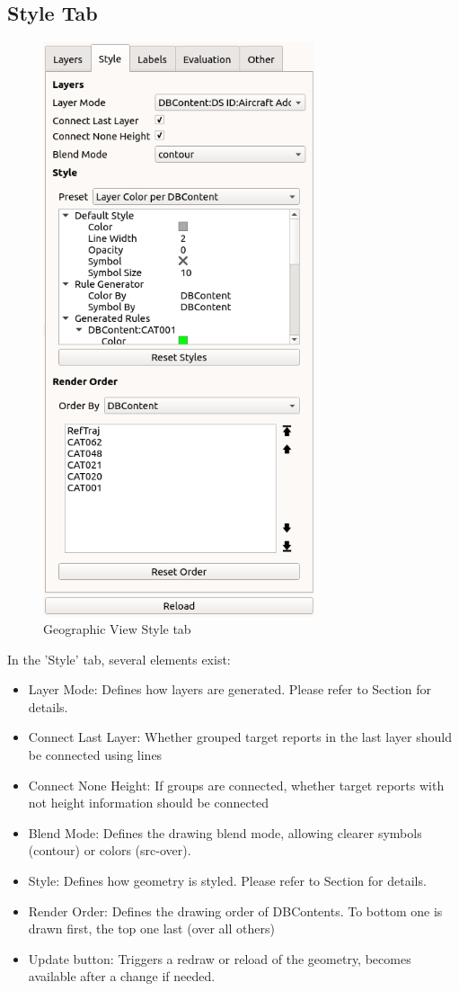 \subsection{Style Tab}
\label{sec:geoview_style}

\begin{figure}[H]
   \center
    \includegraphics[width=8cm,frame]{figures/geoview_style_tab.png}
  \caption{Geographic View Style tab}
\end{figure}

In the 'Style' tab, several elements exist:

\begin{itemize}
 \item Layer Mode: Defines how layers are generated. Please refer to Section  for details.
 \item Connect Last Layer: Whether grouped target reports in the last layer should be connected using lines
 \item Connect None Height: If groups are connected, whether target reports with not height information should be connected
 \item Blend Mode: Defines the drawing blend mode, allowing clearer symbols (contour) or colors (src-over).
 \item Style: Defines how geometry is styled. Please refer to Section  for details.
 \item Render Order: Defines the drawing order of DBContents. To bottom one is drawn first, the top one last (over all others)
 \item Update button: Triggers a redraw or reload of the geometry, becomes available after a change if needed.
\end{itemize} 

